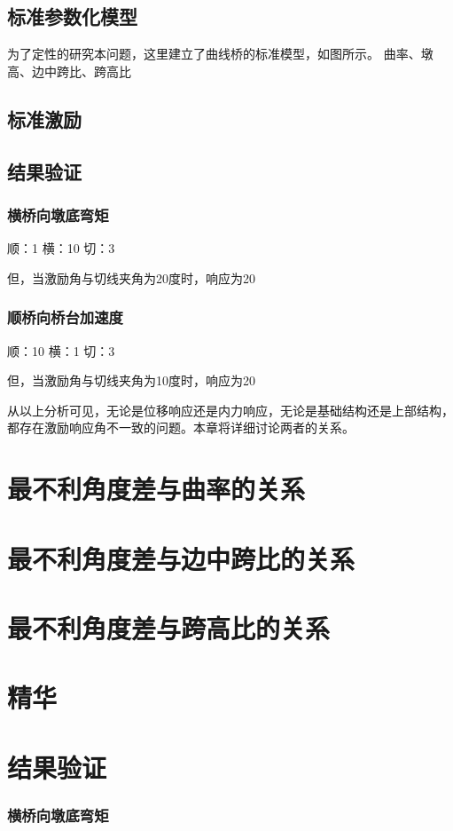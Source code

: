 \documentclass{bjtuthesis}
\begin{document}
\subsection{标准参数化模型}
为了定性的研究本问题，这里建立了曲线桥的标准模型，如图所示。
曲率、墩高、边中跨比、跨高比
\subsection{标准激励}

\subsection{结果验证}

\subsubsection{横桥向墩底弯矩}
顺：1
横：10
切：3

但，当激励角与切线夹角为20度时，响应为20

\subsubsection{顺桥向桥台加速度}

顺：10
横：1
切：3

但，当激励角与切线夹角为10度时，响应为20

从以上分析可见，无论是位移响应还是内力响应，无论是基础结构还是上部结构，都存在激励响应角不一致的问题。本章将详细讨论两者的关系。

\section{最不利角度差与曲率的关系}
\section{最不利角度差与边中跨比的关系}
\section{最不利角度差与跨高比的关系}
\section{精华}
\section{结果验证}

\subsubsection{横桥向墩底弯矩}
\end{document}

